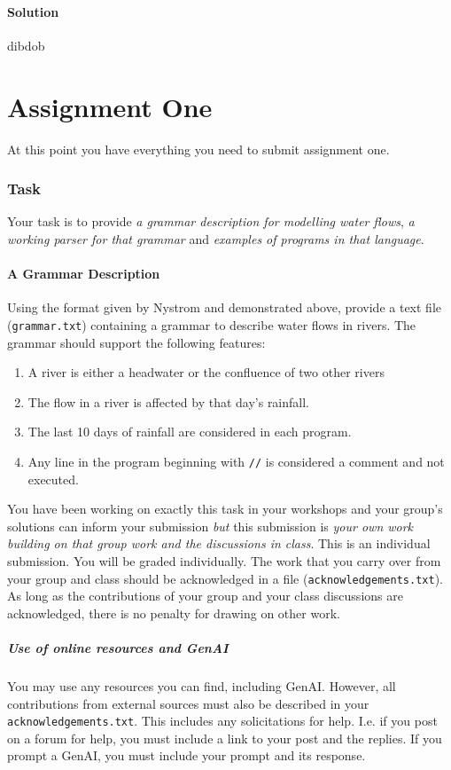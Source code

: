 \documentclass[twoside=false, DIV=14]{scrartcl}
\begin{document}
\subsection*{Solution}
dibdob

\newpage
\part*{Assignment One}
At this point you have everything you need to submit assignment one.

\section{Task}
Your task is to provide \emph{a grammar description for modelling water flows}, \emph{a working parser for that grammar} and \emph{examples of programs in that language}.

\subsection{A Grammar Description}
Using the format given by Nystrom and demonstrated above, provide a text file (\lstinline|grammar.txt|) containing a grammar to describe water flows in rivers.  The grammar should support the following features:
\begin{enumerate}
\item A river is either a headwater or the confluence of two other rivers
\item The flow in a river is affected by that day's rainfall.
\item The last 10 days of rainfall are considered in each program.
\item Any line in the program beginning with \lstinline|//| is considered a comment and not executed.
\end{enumerate}

You have been working on exactly this task in your workshops and your group's solutions can inform your submission \emph{but} this submission is \emph{your own work building on that group work and the discussions in class}.  This is an individual submission.  You will be graded individually.  The work that you carry over from your group and class should be acknowledged in a file (\lstinline|acknowledgements.txt|).  As long as the contributions of your group and your class discussions are acknowledged, there is no penalty for drawing on other work.

\subsubsection{Use of online resources and GenAI}
You may use any resources you can find, including GenAI.  However, all contributions from external sources must also be described in your \lstinline|acknowledgements.txt|. This includes any solicitations for help.  I.e. if you post on a forum for help, you must include a link to your post and the replies.  If you prompt a GenAI, you must include your prompt and its response.
\end{document}
